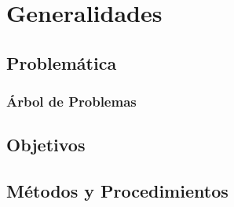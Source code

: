
\chapter{Generalidades}
\section{Problemática}
\subsection{Árbol de Problemas}
\section{Objetivos}
\section{Métodos y Procedimientos}

